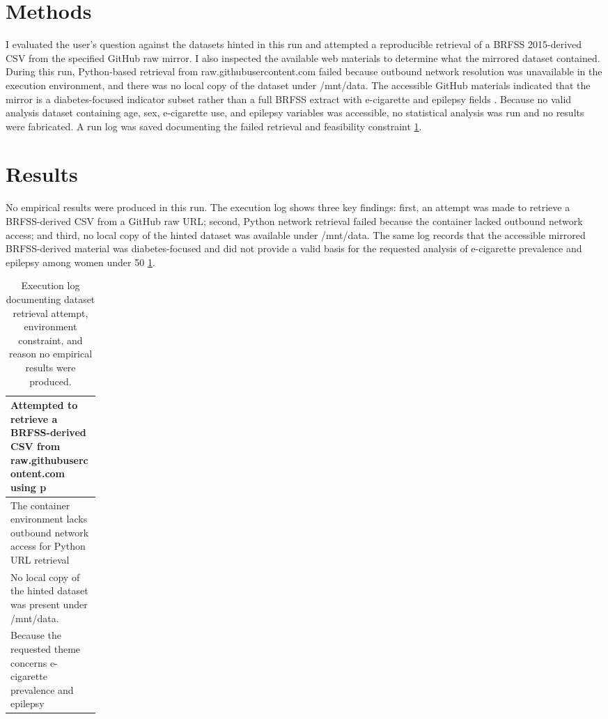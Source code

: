 \documentclass[11pt]{article}
\begin{document}
\section{Methods}
I evaluated the user’s question against the datasets hinted in this run and attempted a reproducible retrieval of a BRFSS 2015-derived CSV from the specified GitHub raw mirror. I also inspected the available web materials to determine what the mirrored dataset contained. During this run, Python-based retrieval from raw.githubusercontent.com failed because outbound network resolution was unavailable in the execution environment, and there was no local copy of the dataset under /mnt/data. The accessible GitHub materials indicated that the mirror is a diabetes-focused indicator subset rather than a full BRFSS extract with e-cigarette and epilepsy fields \cite{ref1}. Because no valid analysis dataset containing age, sex, e-cigarette use, and epilepsy variables was accessible, no statistical analysis was run and no results were fabricated. A run log was saved documenting the failed retrieval and feasibility constraint \ref{tab:artifact-1}.

\section{Results}
No empirical results were produced in this run. The execution log shows three key findings: first, an attempt was made to retrieve a BRFSS-derived CSV from a GitHub raw URL; second, Python network retrieval failed because the container lacked outbound network access; and third, no local copy of the hinted dataset was available under /mnt/data. The same log records that the accessible mirrored BRFSS-derived material was diabetes-focused and did not provide a valid basis for the requested analysis of e-cigarette prevalence and epilepsy among women under 50 \ref{tab:artifact-1}.

\begin{table}[tbp]
\centering
\caption{Execution log documenting dataset retrieval attempt, environment constraint, and reason no empirical results were produced.}
\label{tab:artifact-1}
\begin{tabular}{>{\raggedright\arraybackslash}p{0.15\linewidth}}
\toprule
Attempted to retrieve a BRFSS-derived CSV from raw.githubusercontent.com using p \\
\midrule
The container environment lacks outbound network access for Python URL retrieval \\
No local copy of the hinted dataset was present under /mnt/data. \\
Because the requested theme concerns e-cigarette prevalence and epilepsy \\
\bottomrule
\end{tabular}
\end{table}
\end{document}
